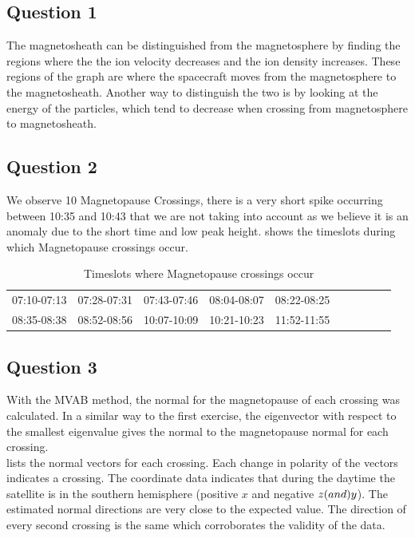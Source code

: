 	\subsection*{Question 1}
    	The magnetosheath can be distinguished from the magnetosphere by finding the regions where the the ion velocity decreases and the ion density increases. These regions of the graph are where the spacecraft moves from the magnetosphere to the magnetosheath. Another way to distinguish the two is by looking at the energy of the particles, which tend to decrease when crossing from magnetosphere to magnetosheath.
        
        
    \subsection*{Question 2}
     We observe 10 Magnetopause Crossings, there is a very short spike occurring between 10:35 and 10:43 that we are not taking into account as we believe it is an anomaly due to the short time and low peak height.
      shows the timeslots during which Magnetopause crossings occur.
     
\begin{table}[h!]
\centering
\caption{Timeslots where Magnetopause crossings occur}
\label{tab:crossings}
\begin{tabular}{llllllllll}
07:10-07:13 & 07:28-07:31 & 07:43-07:46 & 08:04-08:07 & 08:22-08:25\\  08:35-08:38 & 08:52-08:56 & 10:07-10:09 & 10:21-10:23 & 11:52-11:55
\end{tabular}
\end{table}
    
\subsection*{Question 3}
With the MVAB method, the normal for the magnetopause of each crossing was calculated. In a similar way to the first exercise, the eigenvector with respect to the smallest eigenvalue gives the normal to the magnetopause normal for each crossing.\\
 lists the normal vectors for each crossing. Each change in polarity of the vectors indicates a crossing. The coordinate data indicates that during the daytime the satellite is in the southern hemisphere (positive $x$ and negative $z \text(and) y$). The estimated normal directions are very close to the expected value. The direction of every second crossing is the same which corroborates the validity of the data.

